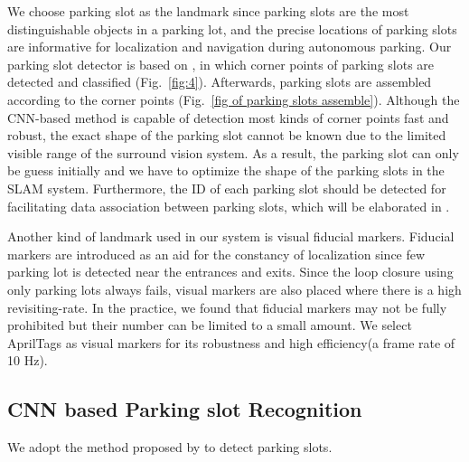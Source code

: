 \documentclass[journal]{IEEEtran}
\newcommand{\Reffig}[1]{Fig.~\ref{#1}}
\begin{document}
%

We choose parking slot as the landmark since parking slots are the most distinguishable objects in a parking lot, and the precise locations of parking slots are informative for localization and navigation during autonomous parking.
Our parking slot detector is based on \citep{Li2017Vision}, in which corner points of parking slots are detected and classified (\Reffig{fig:4}).
Afterwards, parking slots are assembled according to the corner points (\Reffig{fig of parking slots assemble}).
Although the CNN-based method is capable of detection  most kinds of corner points fast and robust, the exact shape of the parking slot cannot be known due to the limited visible range of the surround vision system.
As a result, the parking slot can only be guess initially and we have to optimize the shape of the parking slots in the SLAM system.
Furthermore, the ID of each parking slot should be detected for facilitating data association between parking slots, which will be elaborated in \sec{}.

%

Another kind of landmark used in our system is visual fiducial markers.
Fiducial markers are introduced as an aid for the constancy of localization since few parking lot is detected near the entrances and exits. 
Since the loop closure using only parking lots always fails, visual markers are also placed where there is a high revisiting-rate.
In the practice, we found that fiducial markers may not be fully prohibited but their number can be limited to a small amount. 
We select AprilTags as visual markers for its robustness and high efficiency(a frame rate of 10 Hz)\citep{Olson2011AprilTag}.

\subsection{CNN based Parking slot Recognition}

We adopt the method proposed by \citep{Li2017Vision} to detect parking slots.
\end{document}
